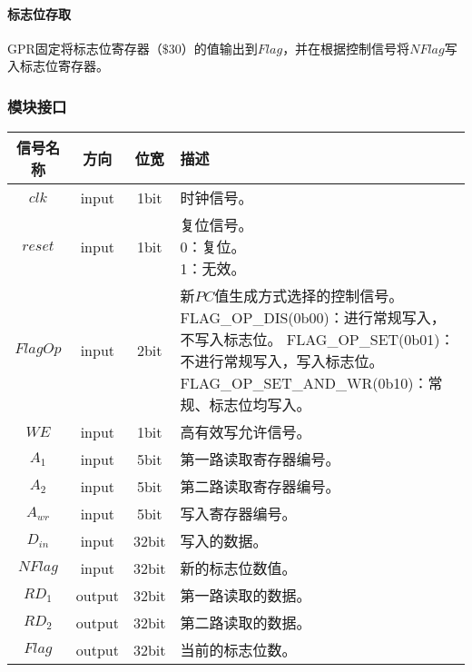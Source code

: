 \documentclass[main.tex]{subfiles}
\begin{document}
\paragraph{标志位存取}
GPR固定将标志位寄存器（$\$30$）的值输出到$Flag$，并在根据控制信号将$NFlag$写入标志位寄存器。

\subsubsection{模块接口}
\begin{center}
    \begin{tabular}{c c c l}
        \toprule
        信号名称 & 方向 & 位宽 & 描述 \\
        \midrule
        $clk$ & input & 1bit & 时钟信号。\\
        $reset$ & input & 1bit & \makecell[lt]{
            复位信号。\\
             0：复位。\\
             1：无效。
        } \\
        $FlagOp$ & input & 2bit & \makecell[lt]{
            新$PC$值生成方式选择的控制信号。\\
            FLAG\_OP\_DIS(0b00)：进行常规写入，不写入标志位。\\
            FLAG\_OP\_SET(0b01)：不进行常规写入，写入标志位。\\
            FLAG\_OP\_SET\_AND\_WR(0b10)：常规、标志位均写入。\\
        } \\
        $WE$ & input & 1bit & 高有效写允许信号。 \\
        \midrule
        $A_1$ & input & 5bit & 第一路读取寄存器编号。 \\
        $A_2$ & input & 5bit & 第二路读取寄存器编号。 \\
        $A_{wr}$ & input & 5bit & 写入寄存器编号。 \\
        $D_{in}$ & input & 32bit & 写入的数据。 \\
        $NFlag$ & input & 32bit & 新的标志位数值。 \\
        $RD_1$ & output & 32bit & 第一路读取的数据。 \\
        $RD_2$ & output & 32bit & 第二路读取的数据。 \\
        $Flag$ & output & 32bit & 当前的标志位数。 \\
        \bottomrule
    \end{tabular}
\end{center}
\end{document}
